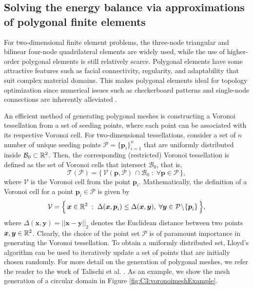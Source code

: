 \subsection[Solving the energy balance via polygonal elements]{Solving the energy balance via approximations of polygonal finite elements}
For two-dimensional finite element problems, the three-node triangular and bilinear four-node quadrilateral elements are widely used, while the use of higher-order polygonal elements is still relatively scarce. Polygonal elements have some attractive features such as facial connectivity, regularity, and adaptability that suit complex material domains. This makes polygonal elements ideal for topology optimization since numerical issues such as checkerboard patterns and single-node connections are inherently alleviated \cite{Talischi2012,Gain2013Dec}. 

An efficient method of generating polygonal meshes is constructing a Voronoi tessellation from a set of seeding points, where each point can be associated with its respective Voronoi cell. For two-dimensional tessellations, consider a set of $n$ number of unique seeding points $\mathcal{P} = \{ \boldsymbol{p}_i \}^n_{i = 1}$ that are uniformly distributed inside $\mathcal{B}_0 \subset \mathbb{R}^2$. Then, the corresponding (restricted) Voronoi tessellation is defined as the set of Voronoi cells that intersect $\mathcal{B}_0$, that is, 
%
\begin{equation}
\mathcal{T}(\mathcal{P}) = \Big\{\, \mathcal{V}(\boldsymbol{p},\mathcal{P}) \,\cap \mathcal{B}_0 \;:\; \forall \boldsymbol{p} \in \mathcal{P} \,\Big\},
\end{equation}
%
where $\mathcal{V}$ is the Voronoi cell from the point $\boldsymbol{p}_i$. Mathematically, the definition of a Voronoi cell for a point $\boldsymbol{p}_i \in \mathcal{P}$ is given by
%
\begin{equation}
\mathcal{V} = \Big\{\, \boldsymbol{x}\in \mathbb{R}^2 \;:\; \Delta(\boldsymbol{x},\boldsymbol{p}_i) \le \Delta(\boldsymbol{x},\boldsymbol{y}),\; \forall \boldsymbol{y} \in \mathcal{P}\!\setminus\!\{\boldsymbol{p}_i\}  \,\Big\}, \label{eq:vorcell}
\end{equation}
%
where $\Delta(\boldsymbol{x},\boldsymbol{y}) = ||\boldsymbol{x} -  \boldsymbol{y}||_2$ denotes the Euclidean distance between two points $\boldsymbol{x},\boldsymbol{y}\in \mathbb{R}^2$. Clearly, the choice of the point set $\mathcal{P}$ is of paramount importance in generating the Voronoi tessellation. To obtain a uniformly distributed set, Lloyd's algorithm can be used to iteratively update a set of points that are initially chosen randomly. For more detail on the generation of polygonal meshes, we refer the reader to the work of Talischi et al. \cite{Talischi2012}. As an example, we show the mesh generation of a circular domain in Figure \ref{fig:C3:voronoimeshExample}.  

